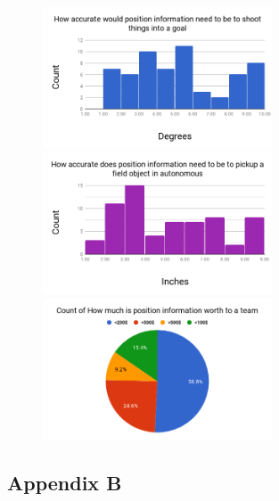 \documentclass{article}
\begin{document}
    \begin{figure}[H]
      \includegraphics[height=4.2cm]{./images/survey_angle.png}
      \includegraphics[height=4.2cm]{./images/survey_position.png}
      \includegraphics[height=4.2cm]{./images/survey_worth.png}
      \label{fig:survey_imgs}
    \end{figure}

  \subsection{Appendix B}\label{appendix:rf-rx-tx}
\end{document}
